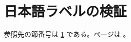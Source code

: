 \documentclass{jlreq}
\begin{document}
\section{日本語ラベルの検証}\label{日本語ラベル}
参照先の節番号は \ref{日本語ラベル} である。ページは \pageref{日本語ラベル}。
\end{document}
